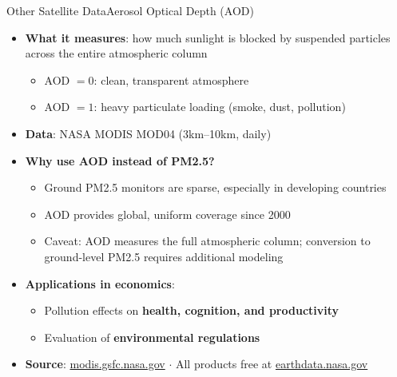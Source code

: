 \documentclass[hyperref={pdfpagelabels=false}]{beamer}
\begin{document}
\begin{frame}{Other Satellite Data}{Aerosol Optical Depth (AOD)}
\begin{itemize}
    \item \textbf{What it measures}: how much sunlight is blocked 
    by suspended particles across the entire atmospheric column
    \vspace{0.2cm}
    \begin{itemize}
        \item AOD $= 0$: clean, transparent atmosphere
        \vspace{0.1cm}
        \item AOD $= 1$: heavy particulate loading (smoke, dust, pollution)
    \end{itemize}
    \vspace{0.2cm}
    \item \textbf{Data}: NASA MODIS MOD04 (3km--10km, daily)
    \vspace{0.2cm}
    \item \textbf{Why use AOD instead of PM2.5?}
    \vspace{0.1cm}
    \begin{itemize}
        \item Ground PM2.5 monitors are sparse, especially 
        in developing countries
        \vspace{0.1cm}
        \item AOD provides global, uniform coverage since 2000
        \vspace{0.1cm}
        \item Caveat: AOD measures the full atmospheric column; 
        conversion to ground-level PM2.5 requires additional modeling
    \end{itemize}
    \vspace{0.2cm}
    \item \textbf{Applications in economics}:
    \vspace{0.1cm}
    \begin{itemize}
        \item Pollution effects on \textbf{health, cognition, and productivity}
        \vspace{0.1cm}
        \item Evaluation of \textbf{environmental regulations}
    \end{itemize}
    \vspace{0.1cm}
    \item \textbf{Source}: 
    \href{https://modis.gsfc.nasa.gov/data/dataprod/}{modis.gsfc.nasa.gov} 
    $\cdot$ All products free at 
    \href{https://earthdata.nasa.gov}{earthdata.nasa.gov}
\end{itemize}
\end{frame}
\end{document}

